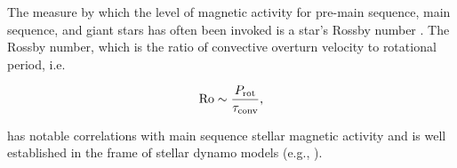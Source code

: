 \documentclass[linenumbers]{aastex631}
\begin{document}

%

%
The measure by which the level of magnetic activity for pre-main sequence, main sequence, and giant stars has often been invoked is a star's Rossby number \citep{Preibisch+2005, Pizzolato+2003, Gondoin+2005}. 
The Rossby number, which is the ratio of convective overturn velocity to rotational period, i.e.

\begin{equation}
{\rm Ro} \sim \frac{P_{\rm rot}}{\tau_{\rm conv}},
\end{equation}

has notable correlations with main sequence stellar magnetic activity and is well established in the frame of stellar dynamo models (e.g., \citealt{Brandenburg+1998}). 
\end{document}
